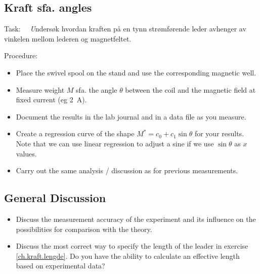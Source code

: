 \documentclass[../Elmag-labhefte-2020.tex]{subfiles}
\begin{document}

\subsection{Kraft sfa. angles}

Task: \ \
{\emph Undersøk hvordan kraften på en tynn strømførende leder avhenger av vinkelen mellom lederen og magnetfeltet.}

Procedure:
%
\vspace{-4mm}
\begin{itemize}
    \item Place the swivel spool on the stand and use the corresponding magnetic well.
    \item Measure weight $M$ sfa. the angle $\theta$ between the coil and the magnetic field at fixed current (eg \SI{2}{\ampere}).
    \item Document the results in the lab journal and in a data file as you measure. %
    \item Create a regression curve of the shape \(M ^{*} = c_0 + c_1 \sin \theta \) for your results. Note that we can use linear regression to adjust a sine if we use \(\sin \theta \) as \(x \) values.
    \item Carry out the same analysis / discussion as for previous measurements.
\end{itemize}

\subsection{General Discussion}

\vspace{-4mm}
\begin{itemize}
    \item Discuss the measurement accuracy of the experiment and its influence on the possibilities for comparison with the theory.
    \item Discuss the most correct way to specify the length of the leader in exercise \ref{ch.kraft.lengde}. Do you have the ability to calculate an effective length based on experimental data?
\end{itemize}
\end{document}
